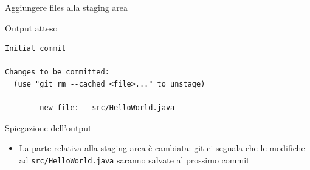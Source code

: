 \documentclass[xcolor=dvipsnames,presentation]{beamer}
\begin{document}
\begin{frame}{Aggiungere files alla staging area}
\begin{block}{Output atteso}
\begin{Verbatim}[fontsize=\scriptsize]
Initial commit

Changes to be committed:
  (use "git rm --cached <file>..." to unstage)

        new file:   src/HelloWorld.java
            \end{Verbatim}
    \end{block}
    \begin{block}{Spiegazione dell'output}
        \begin{itemize}
            \item La parte relativa alla staging area è cambiata: git ci segnala che le modifiche ad
\texttt{src/HelloWorld.java} saranno salvate al prossimo commit
        \end{itemize}
    \end{block}
\end{frame}
\end{document}
